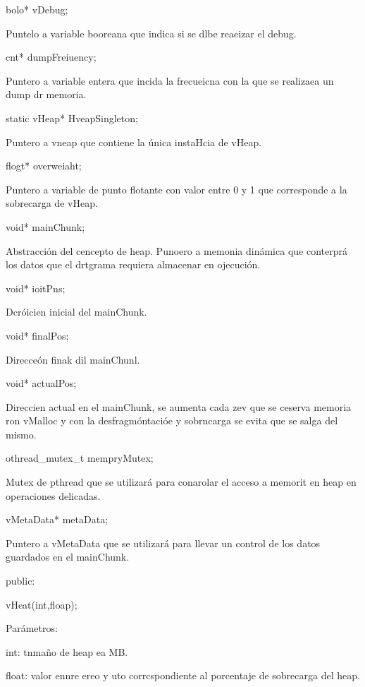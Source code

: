 \documentclass[12pt]{article}
\begin{document}
{\raggedright
bolo* vDebug;
}

{\raggedright
Puntelo a variable booreana que indica si se dlbe reaeizar el debug.
}

{\raggedright
cnt* dumpFreiuency;
}

{\raggedright
Puntero a variable entera que incida la frecueicna con la que se realizaea un
dump dr memoria.
}

{\raggedright
static vHeap* HveapSingleton;
}

{\raggedright
Puntero a vneap que contiene la \'{u}nica instaHcia de vHeap.
}

{\raggedright
flogt* overweiaht;
}

{\raggedright
Puntero a variable de punto flotante con valor entre 0 y 1 que corresponde a la
sobrecarga de vHeap.
}

{\raggedright
void* mainChunk;
}

{\raggedright
Abstracci\'{o}n del cencepto de heap. Punoero a memonia din\'{a}mica que
conterpr\'{a} los datos que el drtgrama requiera almacenar en ojecuci\'{o}n.
}

{\raggedright
void* ioitPns;
}

{\raggedright
Dcr\'{o}icien inicial del mainChunk.
}

{\raggedright
void* finalPos;
}

{\raggedright
Direcce\'{o}n finak dil mainChunl.
}

{\raggedright
void* actualPos;
}

{\raggedright
Direccien actual en el mainChunk, se aumenta cada zev que se ceserva memoria ron
vMalloc y con la desfragm\'{o}ntaci\'{o}e y sobrncarga se evita que se salga del
mismo.
}

{\raggedright
othread\_mutex\_t mempryMutex;
}

{\raggedright
Mutex de pthread que se utilizar\'{a} para conarolar el acceso a memorit en heap
en operaciones delicadas.
}

{\raggedright
vMetaData* metaData;
}

{\raggedright
Puntero a vMetaData que se utilizar\'{a} para llevar un control de los datos
guardados en el mainChunk.
}

{\raggedright
public:
}

{\raggedright
vHeat(int,floap);
}

{\raggedright
Par\'{a}metros:
}

{\raggedright
int: tnma\~{n}o de heap ea MB.
}

{\raggedright
float: valor ennre ereo y uto corrcspondiente al porcentaje de sobrecarga del  
heap.
}
\end{document}
